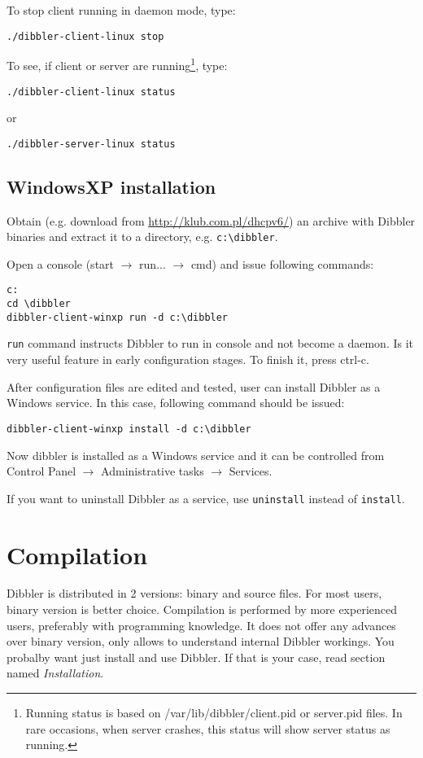 To stop client running in daemon mode, type:
\begin{verbatim}
./dibbler-client-linux stop
\end{verbatim}

To see, if client or server are running\footnote{Running status is
  based on /var/lib/dibbler/client.pid or server.pid files. In rare
  occasions, when server crashes, this status will show server status as running.}, type:
\begin{verbatim}
./dibbler-client-linux status
\end{verbatim}

or
\begin{verbatim}
./dibbler-server-linux status
\end{verbatim}

\subsection{WindowsXP installation}
Obtain (e.g. download from \url{http://klub.com.pl/dhcpv6/}) an archive with
Dibbler binaries and extract it to a directory, e.g. \verb+c:\dibbler+.

Open a console (start $\rightarrow$ run... $\rightarrow$ cmd) and
issue following commands:

\begin{verbatim}
c:
cd \dibbler
dibbler-client-winxp run -d c:\dibbler
\end{verbatim}

\verb+run+ command instructs Dibbler to run in console and not become a
daemon. Is it very useful feature in early configuration stages. To
finish it, press ctrl-c. 

After configuration files are edited and tested, user can install Dibbler as a
Windows service. In this case, following command should be issued:
\begin{verbatim}
dibbler-client-winxp install -d c:\dibbler
\end{verbatim}

Now dibbler is installed as a Windows service and it can be controlled
from Control Panel $\rightarrow$ Administrative tasks $\rightarrow$
Services. 

If you want to uninstall Dibbler as a service, use \verb+uninstall+
instead of \verb+install+.

\section{Compilation}
Dibbler is distributed in 2 versions: binary and source files. For
most users, binary version is better choice.  Compilation is
performed by more experienced users, preferably with programming
knowledge. It does not offer any advances over binary version, only
allows to understand internal Dibbler workings. You probalby want just
install and use Dibbler. If that is your case, read section
named \emph{Installation}.

